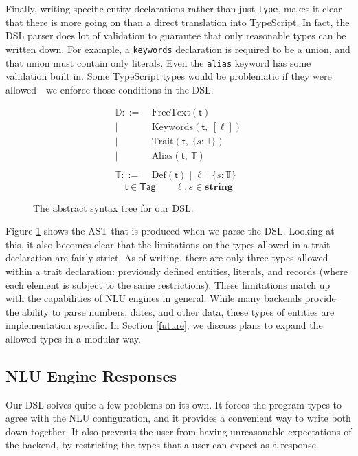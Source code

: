 \documentclass[twocolumn]{article}
\newcommand{\ts}[1]{\texttt{#1}}
\newcommand{\etag}[1]{\textsf{#1}}
\newcommand{\ff}[1]{\textsf{#1}}
\begin{document}
Finally, writing specific entity declarations rather than just \ts{type}, makes
it clear that there is more going on than a direct translation into TypeScript.
In fact, the DSL parser does lot of validation to guarantee that only reasonable
types can be written down. For example, a \ts{keywords} declaration is required
to be a union, and that union must contain only literals. Even the \ts{alias}
keyword has some validation built in. Some TypeScript types would be problematic
if they were allowed---we enforce those conditions in the DSL.

\begin{figure}
  \centering
  \begin{align*}
    \mathbb{D} ::=&\ \text{FreeText}(\etag{t}) \\
    |&\ \text{Keywords}(\etag{t},\ [\ell]) \\
    |&\ \text{Trait}(\etag{t},\ \{s: \mathbb{T}\}) \\
    |&\ \text{Alias}(\etag{t},\ \mathbb{T}) \\
    \\
    \mathbb{T} ::=&\ \text{Def}(\etag{t}) \mid \ell \mid \{s: \mathbb{T}\}
  \end{align*}
  $$ \etag{t} \in \ff{Tag} \qquad \ell, s \in \textbf{string} $$
  \caption{The abstract syntax tree for our DSL.}
  \label{fig:ast}
\end{figure}

Figure \ref{fig:ast} shows the AST that is produced when we parse the DSL.
Looking at this, it also becomes clear that the limitations on the types allowed
in a trait declaration are fairly strict. As of writing, there are only three
types allowed within a trait declaration: previously defined entities, literals,
and records (where each element is subject to the same restrictions). These
limitations match up with the capabilities of NLU engines in general. While many
backends provide the ability to parse numbers, dates, and other data, these
types of entities are implementation specific. In Section \ref{future}, we
discuss plans to expand the allowed types in a modular way.

\subsection{NLU Engine Responses}
Our DSL solves quite a few problems on its own. It forces the program types to
agree with the NLU configuration, and it provides a convenient way to write both
down together. It also prevents the user from having unreasonable expectations
of the backend, by restricting the types that a user can expect as a response.
\end{document}
